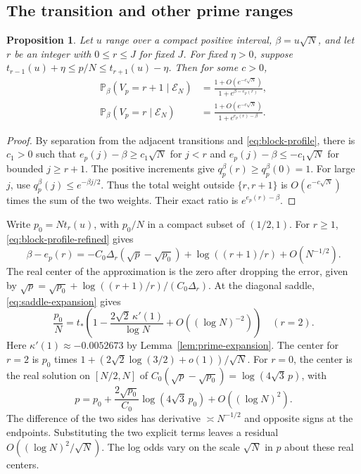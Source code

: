 \documentclass[11pt]{amsart}
\newtheorem{proposition}[theorem]{Proposition}
\theoremstyle{remark}
\newcommand{\Pp}{\mathbb P}
\begin{document}
\subsection{The transition and other prime ranges}

\begin{proposition}\label{prop:logistic-block}
Let \(u\) range over a compact positive interval, \(\beta=u\sqrt N\),
and let \(r\) be an integer with \(0\le r\le J\) for fixed \(J\).
For fixed \(\eta>0\), suppose
\(t_{r-1}(u)+\eta\le p/N\le t_{r+1}(u)-\eta\). Then for some \(c>0\),
\begin{align*}
 \Pp_\beta(V_p=r+1\mid\mathcal E_N)
   &=\frac{1+O(e^{-c\sqrt N})}{1+e^{\beta-e_p(r)}},\\
 \Pp_\beta(V_p=r\mid\mathcal E_N)
   &=\frac{1+O(e^{-c\sqrt N})}{1+e^{e_p(r)-\beta}}.
\end{align*}
\end{proposition}

\begin{proof}
By separation from the adjacent transitions and \eqref{eq:block-profile},
there is \(c_1>0\) such that \(e_p(j)-\beta\ge c_1\sqrt N\) for \(j<r\)
and \(e_p(j)-\beta\le-c_1\sqrt N\) for bounded \(j\ge r+1\).
The positive increments give \(q_p^\beta(r)\ge q_p^\beta(0)=1\).
For large \(j\), use \(q_p^\beta(j)\le e^{-\beta j/2}\).
Thus the total weight outside \(\{r,r+1\}\) is \(O(e^{-c\sqrt N})\)
times the sum of the two weights. Their exact ratio is \(e^{e_p(r)-\beta}\).
\end{proof}

Write \(p_0=Nt_r(u)\), with \(p_0/N\) in a compact subset of \((1/2,1)\).
For \(r\ge1\), \eqref{eq:block-profile-refined} gives
\begin{equation}\label{eq:logistic-exponent}
 \beta-e_p(r)=-C_0\Delta_r(\sqrt p-\sqrt{p_0})
                   +\log((r+1)/r)+O(N^{-1/2}).
\end{equation}
The real center of the approximation is the zero after dropping the error, given by
\(\sqrt p=\sqrt{p_0}+\log((r+1)/r)/(C_0\Delta_r)\).
At the diagonal saddle, \eqref{eq:saddle-expansion} gives
\[
 \frac{p_0}{N}=t_*\left(1-\frac{2\sqrt2\,\kappa'(1)}{\log N}
                         +O((\log N)^{-2})\right)\quad(r=2).
\]
Here \(\kappa'(1)\approx-0.0052673\) by Lemma~\ref{lem:prime-expansion}.
The center for \(r=2\) is \(p_0\) times
\(1+(2\sqrt2\log(3/2)+o(1))/\sqrt N\).
For \(r=0\), the center is the real solution on \([N/2,N]\) of
\(C_0(\sqrt p-\sqrt{p_0})=\log(4\sqrt3\,p)\), with
\[
 p=p_0+\frac{2\sqrt{p_0}}{C_0}\log(4\sqrt3\,p_0)+O((\log N)^2).
\]
The difference of the two sides has derivative \(\asymp N^{-1/2}\)
and opposite signs at the endpoints. Substituting the two explicit
terms leaves a residual \(O((\log N)^2/\sqrt N)\). The log odds vary on
the scale \(\sqrt N\) in \(p\) about these real centers.
\end{document}

